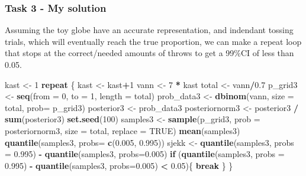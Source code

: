 \documentclass[]{article}
\newenvironment{Shaded}{\begin{snugshade}}{\end{snugshade}}
\newcommand{\ControlFlowTok}[1]{\textcolor[rgb]{0.13,0.29,0.53}{\textbf{#1}}}
\newcommand{\DataTypeTok}[1]{\textcolor[rgb]{0.13,0.29,0.53}{#1}}
\newcommand{\DecValTok}[1]{\textcolor[rgb]{0.00,0.00,0.81}{#1}}
\newcommand{\FloatTok}[1]{\textcolor[rgb]{0.00,0.00,0.81}{#1}}
\newcommand{\KeywordTok}[1]{\textcolor[rgb]{0.13,0.29,0.53}{\textbf{#1}}}
\newcommand{\NormalTok}[1]{#1}
\newcommand{\OperatorTok}[1]{\textcolor[rgb]{0.81,0.36,0.00}{\textbf{#1}}}
\newcommand{\OtherTok}[1]{\textcolor[rgb]{0.56,0.35,0.01}{#1}}
\newcommand{\StringTok}[1]{\textcolor[rgb]{0.31,0.60,0.02}{#1}}
\begin{document}
\hypertarget{task-3---my-solution}{%
\subsubsection{Task 3 - My solution}\label{task-3---my-solution}}

Assuming the toy globe have an accurate representation, and indendant
tossing trials, which will eventually reach the true proportion, we can
make a repeat loop that stops at the correct/needed amounts of throws to
get a 99\%CI of less than 0.05.

\begin{Shaded}
\begin{Highlighting}[]
\NormalTok{kast <-}\StringTok{ }\DecValTok{1}
\ControlFlowTok{repeat}\NormalTok{ \{}
\NormalTok{kast <-}\StringTok{ }\NormalTok{kast}\OperatorTok{+}\DecValTok{1}
\NormalTok{vann <-}\StringTok{ }\DecValTok{7} \OperatorTok{*}\StringTok{ }\NormalTok{kast}
\NormalTok{total <-}\StringTok{ }\NormalTok{vann}\OperatorTok{/}\FloatTok{0.7}
\NormalTok{p_grid3 <-}\StringTok{ }\KeywordTok{seq}\NormalTok{(}\DataTypeTok{from =} \DecValTok{0}\NormalTok{, }\DataTypeTok{to =} \DecValTok{1}\NormalTok{, }\DataTypeTok{length =}\NormalTok{ total)}
\NormalTok{prob_data3 <-}\StringTok{ }\KeywordTok{dbinom}\NormalTok{(vann, }\DataTypeTok{size =}\NormalTok{ total, }\DataTypeTok{prob=}\NormalTok{ p_grid3)}
\NormalTok{posterior3 <-}\StringTok{ }\NormalTok{prob_data3}
\NormalTok{posteriornorm3 <-}\StringTok{ }\NormalTok{posterior3 }\OperatorTok{/}\StringTok{ }\KeywordTok{sum}\NormalTok{(posterior3)}
\KeywordTok{set.seed}\NormalTok{(}\DecValTok{100}\NormalTok{)}
\NormalTok{samples3 <-}\StringTok{ }\KeywordTok{sample}\NormalTok{(p_grid3, }\DataTypeTok{prob =}\NormalTok{ posteriornorm3, }\DataTypeTok{size =}\NormalTok{ total, }\DataTypeTok{replace =} \OtherTok{TRUE}\NormalTok{)}
\KeywordTok{mean}\NormalTok{(samples3)}
\KeywordTok{quantile}\NormalTok{(samples3, }\DataTypeTok{probs=} \KeywordTok{c}\NormalTok{(}\FloatTok{0.005}\NormalTok{, }\FloatTok{0.995}\NormalTok{))}
\NormalTok{sjekk <-}\StringTok{ }\KeywordTok{quantile}\NormalTok{(samples3, }\DataTypeTok{probs =} \FloatTok{0.995}\NormalTok{) }\OperatorTok{-}\StringTok{ }\KeywordTok{quantile}\NormalTok{(samples3, }\DataTypeTok{probs=}\FloatTok{0.005}\NormalTok{)}
\ControlFlowTok{if}\NormalTok{ (}\KeywordTok{quantile}\NormalTok{(samples3, }\DataTypeTok{probs =} \FloatTok{0.995}\NormalTok{) }\OperatorTok{-}\StringTok{ }\KeywordTok{quantile}\NormalTok{(samples3, }\DataTypeTok{probs=}\FloatTok{0.005}\NormalTok{) }\OperatorTok{<}\StringTok{ }\FloatTok{0.05}\NormalTok{)\{}
  \ControlFlowTok{break}
\NormalTok{\}}
\NormalTok{\}}
\end{Highlighting}
\end{Shaded}
\end{document}
